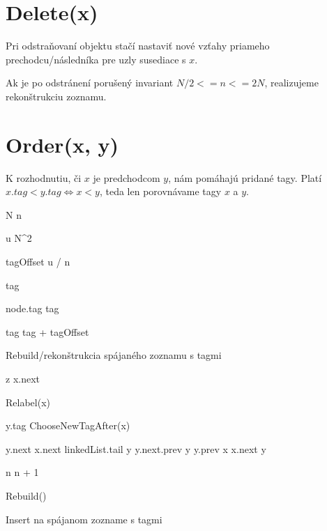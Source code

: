 \documentclass[
  digital,     %
  oneside,     %
  nosansbold,  %
  nocolorbold, %
  lof,         %
  lot,         %
]{fithesis4}
\begin{document}
\section{Delete(x)}
Pri odstraňovaní objektu stačí nastaviť nové vzťahy priameho prechodcu/následníka pre uzly susediace s $x$.

Ak je po odstránení porušený invariant $N/2 <= n <= 2N$, realizujeme rekonštrukciu zoznamu.

\section{Order(x, y)}
K rozhodnutiu, či $x$ je predchodcom $y$, nám pomáhajú pridané tagy. Platí $x.tag < y.tag \iff x < y$, teda len porovnávame tagy $x$ a $y$.



\begin{algorithm}
\hline\vspace{0.2em}
N \leftarrow n\;

u \leftarrow N^2\;

tagOffset \leftarrow u / n\; 

tag \;

{
    node.tag \leftarrow tag\;
    
    tag \leftarrow tag + tagOffset\;
}

\caption{Rebuild/rekonštrukcia spájaného zoznamu s tagmi}
\end{algorithm}

\begin{algorithm}
\hline\vspace{0.2em}
z \leftarrow x.next\;

{
    Relabel(x)\;
}

y.tag \leftarrow ChooseNewTagAfter(x)\;

y.next \leftarrow x.next\;
{
    linkedList.tail \leftarrow y\;
}
\Else
{
    y.next.prev \leftarrow y\;
}
y.prev \leftarrow x\;
x.next \leftarrow y\;


n \leftarrow n + 1\;

{
    Rebuild()\;
}
\caption{Insert na spájanom zozname s tagmi}
\end{algorithm}
\end{document}
